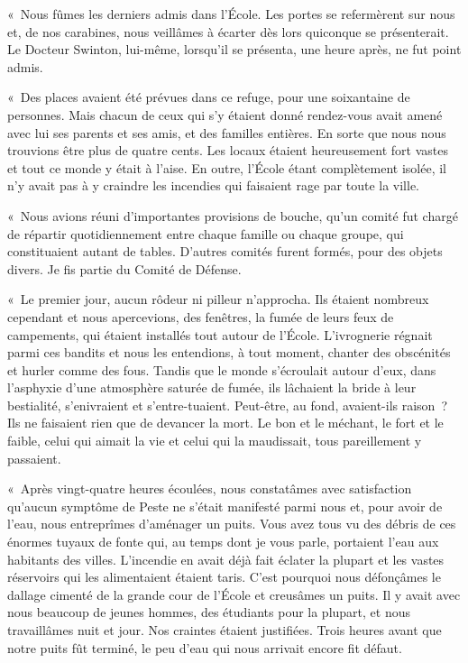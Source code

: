 \documentclass[french,twoside]{book} %
\begin{document}
« Nous fûmes les derniers admis dans l’École. Les portes se refermèrent sur nous et, de nos carabines, nous veillâmes à écarter dès lors quiconque se présenterait. Le Docteur Swinton, lui-même, lorsqu’il se présenta, une heure après, ne fut point admis.\par
« Des places avaient été prévues dans ce refuge, pour une soixantaine de personnes. Mais chacun de ceux qui s’y étaient donné rendez-vous avait amené avec lui ses parents et ses amis, et des familles entières. En sorte que nous nous trouvions être plus de quatre cents. Les locaux étaient heureusement fort vastes et tout ce monde y était à l’aise. En outre, l’École étant complètement isolée, il n’y avait pas à y craindre les incendies qui faisaient rage par toute la ville.\par
« Nous avions réuni d’importantes provisions de bouche, qu’un comité fut chargé de répartir quotidiennement entre chaque famille ou chaque groupe, qui constituaient autant de tables. D’autres comités furent formés, pour des objets divers. Je fis partie du Comité de Défense.\par
« Le premier jour, aucun rôdeur ni pilleur n’approcha. Ils étaient nombreux cependant et nous apercevions, des fenêtres, la fumée de leurs feux de campements, qui étaient installés tout autour de l’École. L’ivrognerie régnait parmi ces bandits et nous les entendions, à tout moment, chanter des obscénités et hurler comme des fous. Tandis que le monde s’écroulait autour d’eux, dans l’asphyxie d’une atmosphère saturée de fumée, ils lâchaient la bride à leur bestialité, s’enivraient et s’entre-tuaient. Peut-être, au fond, avaient-ils raison ? Ils ne faisaient rien que de devancer la mort. Le bon et le méchant, le fort et le faible, celui qui aimait la vie et celui qui la maudissait, tous pareillement y passaient.\par
« Après vingt-quatre heures écoulées, nous constatâmes avec satisfaction qu’aucun symptôme de Peste ne s’était manifesté parmi nous et, pour avoir de l’eau, nous entreprîmes d’aménager un puits. Vous avez tous vu des débris de ces énormes tuyaux de fonte qui, au temps dont je vous parle, portaient l’eau aux habitants des villes. L’incendie en avait déjà fait éclater la plupart et les vastes réservoirs qui les alimentaient étaient taris. C’est pourquoi nous défonçâmes le dallage cimenté de la grande cour de l’École et creusâmes un puits. Il y avait avec nous beaucoup de jeunes hommes, des étudiants pour la plupart, et nous travaillâmes nuit et jour. Nos craintes étaient justifiées. Trois heures avant que notre puits fût terminé, le peu d’eau qui nous arrivait encore fit défaut.\par
\end{document}
